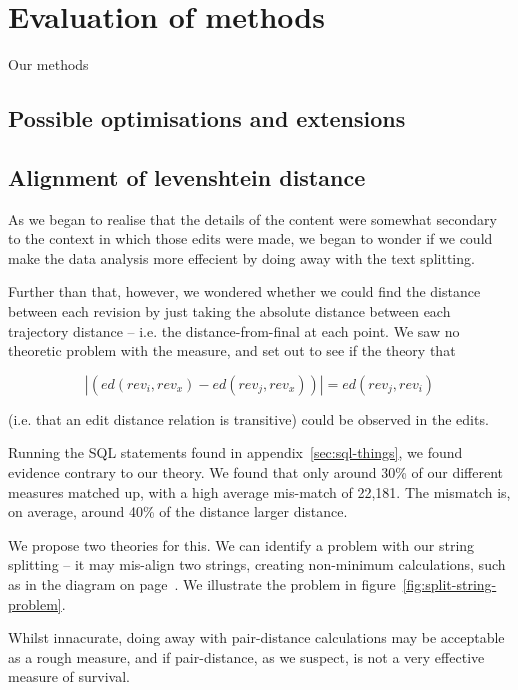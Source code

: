 \section{Evaluation of methods}
Our methods 
\subsection{Possible optimisations and extensions}
\subsection*{Alignment of levenshtein distance}
\label{split-distance-eval}
As we began to realise that the details of the content were somewhat
secondary to the context in which those edits were made, we began to
wonder if we could make the data analysis more effecient by doing away
with the text splitting.

Further than that, however, we wondered whether we could find the
distance between each revision by just taking the absolute distance
between each trajectory distance -- i.e. the distance-from-final at
each point. We saw no theoretic problem with the measure, and set out
to see if the theory that

\[
  |(ed(rev_i,rev_x) - ed(rev_j,rev_x))| = ed(rev_j,rev_i)
\]

(i.e. that an edit distance relation is transitive) could be observed
in the edits. 

Running the SQL statements found in appendix~\ref{sec:sql-things}, we
found evidence contrary to our theory. We found that only around 30\%
of our different measures matched up, with a high average mis-match of
22,181. The mismatch is, on average, around 40\% of the distance
larger distance. 

We propose two theories for this. We can identify a problem with our
string splitting -- it may mis-align two strings, creating non-minimum
calculations, such as in the diagram on page~\pageref{fig:sub-opt}. We
illustrate the problem in figure~\ref{fig:split-string-problem}.

Whilst innacurate, doing away with pair-distance calculations may be
acceptable as a rough measure, and if pair-distance, as we suspect, is
not a very effective measure of survival.

